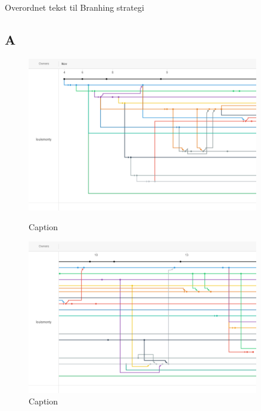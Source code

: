 \begin{flushleft}
    Overordnet tekst til Branhing strategi
    
\end{flushleft}
\subsection{A}
\begin{figure}
    \centering
    \includegraphics[width=0.9\textwidth]{Report/root/1.png}
    \caption{Caption}
    \includegraphics[width=0.9\textwidth]{Report/root/2.png}
    \caption{Caption}
\end{figure}

